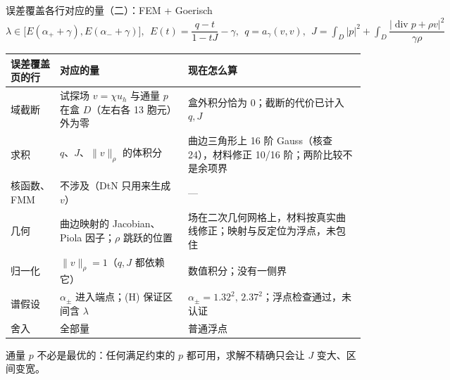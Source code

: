 \documentclass[aspectratio=169,11pt,fontset=fandol]{ctexbeamer}
\newcommand{\aside}[1]{{\footnotesize\color{muted}#1}}
\begin{document}
\begin{frame}{误差覆盖各行对应的量（二）：FEM + Goerisch}
  \centering\small
  $\lambda\in\bigl[E(\alpha_++\gamma),E(\alpha_-+\gamma)\bigr],\ \
    E(t)=\dfrac{q-t}{1-tJ}-\gamma,\ \
    q=a_\gamma(v,v),\ \
    J=\int_D|p|^2+\int_D\dfrac{|\operatorname{div}p+\rho v|^2}{\gamma\rho}$
  \par\vspace{0.4em}\scriptsize
  \begin{tabular}{p{}p{}p{}}
    \toprule
    误差覆盖页的行 & 对应的量 & 现在怎么算 \\
    \midrule
    域截断 & 试探场 $v=\chi u_h$ 与通量 $p$ 在盒 $D$（左右各 13 胞元）外为零 &
      盒外积分恰为 0；截断的代价已计入 $q,J$ \\
    求积 & $q$、$J$、$\|v\|_\rho$ 的体积分 &
      曲边三角形上 16 阶 Gauss（核查 24），材料修正 10/16 阶；两阶比较不是余项界 \\
    核函数、FMM & 不涉及（DtN 只用来生成 $v$） & — \\
    几何 & 曲边映射的 Jacobian、Piola 因子；$\rho$ 跳跃的位置 &
      场在二次几何网格上，材料按真实曲线修正；映射与反定位为浮点，未包住 \\
    归一化 & $\|v\|_\rho=1$（$q,J$ 都依赖它） & 数值积分；没有一侧界 \\
    谱假设 & $\alpha_\pm$ 进入端点；(H) 保证区间含 $\lambda$ &
      $\alpha_\pm=1.32^2,\,2.37^2$；浮点检查通过，\alert{未认证} \\
    舍入 & 全部量 & 普通浮点 \\
    \bottomrule
  \end{tabular}
  \raggedright\vspace{0.3em}
  \aside{通量 $p$ 不必是最优的：任何满足约束的 $p$ 都可用，求解不精确只会让 $J$ 变大、区间变宽。}
\end{frame}
\end{document}
